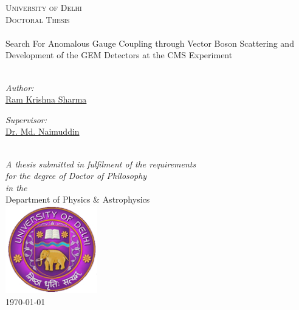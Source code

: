 \begin{titlepage}
\begin{center}

\textsc{\LARGE \color{red!50!black}University of Delhi}\\[1.1cm] %
\textsc{\Large Doctoral Thesis}\\[0.5cm] %

\HRule \\[0.4cm] %
{\huge {}\selectfont Search For Anomalous Gauge Coupling through Vector Boson Scattering and Development of the GEM Detectors at the CMS Experiment}\\[0.4cm] %
\HRule \\[1.5cm] %
 
\begin{minipage}{0.4\textwidth}
\begin{flushleft} \large
\emph{Author:}\\
\href{https://ram1123.github.io/about/}{\color{red!50!black}Ram Krishna Sharma} %
\end{flushleft}
\end{minipage}
\begin{minipage}{0.4\textwidth}
\begin{flushright} \large
\emph{Supervisor:} \\
\href{http://www.du.ac.in/du/uploads/Faculty%20Profiles/2017/Physics/Dec2016_Physics_Naimuddin.pdf}{\color{red!50!black}Dr. Md. Naimuddin} %
\end{flushright}
\end{minipage}\\[2.0cm]
 
\large \textit{A thesis submitted in fulfilment of the requirements\\ for the degree of Doctor of Philosophy}\\[0.3cm] %
\textit{in the}\\[0.3cm]

{\color{red!50!black}Department of Physics \& Astrophysics}\\[0.3cm] %
 
\includegraphics[width=4cm]{figures/logo_du.jpg}\\
{\large \monthyeardate\today}\\ %
 
\vfill
\end{center}
\end{titlepage}